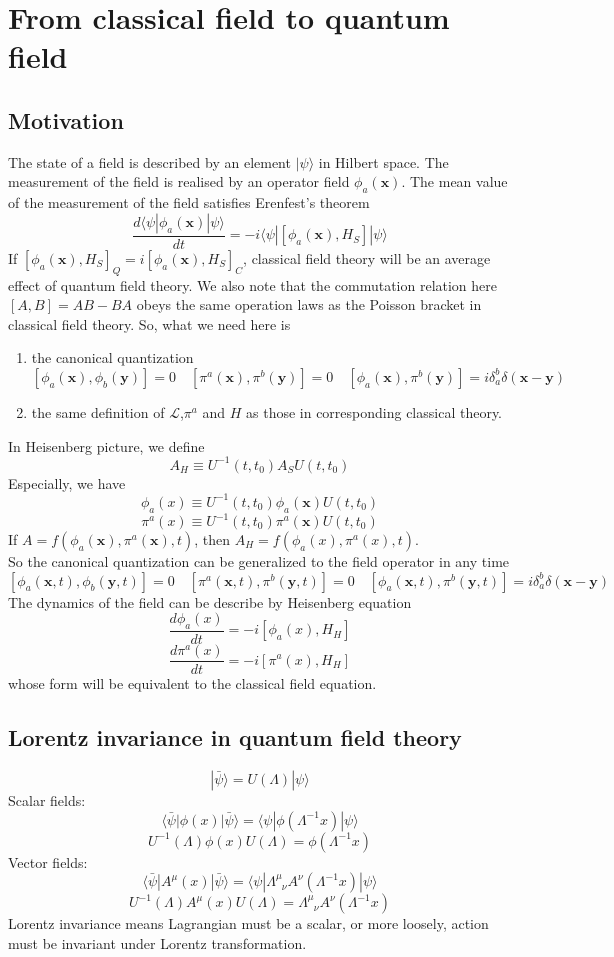 \chapter{From classical field to quantum field}
\section{Motivation}
\noindent
The state of a field is described by an element $|\psi\rangle$ in Hilbert space. The measurement of the field is realised by an operator field $\phi_a(\bm{x})$. The mean value of the measurement of the field satisfies Erenfest's theorem
\[\frac{d\langle \psi| \phi_a(\bm{x}) | \psi \rangle}{dt} = -i \langle \psi | [\phi_a(\bm{x}),H_S] | \psi \rangle\]
If $[\phi_a(\bm{x}),H_S]_Q = i[\phi_a(\bm{x}),H_S]_C$, classical field theory will be an average effect of quantum field theory. We also note that the commutation relation here $[A,B] = AB - BA$ obeys the same operation laws as the Poisson bracket in classical field theory. So, what we need here is
\begin{enumerate}
\item the canonical quantization
\[[\phi_a(\bm{x}),\phi_b(\bm{y})] = 0 \quad [\pi^a(\bm{x}),\pi^b(\bm{y})] = 0 \quad [\phi_a(\bm{x}),\pi^b(\bm{y})] = i \delta_a^b \delta(\bm{x}-\bm{y}) \]
\item the same definition of $\mathcal{L}$,$\pi^a$ and $H$ as those in corresponding classical theory.
\end{enumerate}
In Heisenberg picture, we define
\[A_H \equiv U^{-1}(t,t_0) A_S U(t,t_0)\]
Especially, we have
\[\phi_a(x) \equiv U^{-1}(t,t_0) \phi_a(\bm{x}) U(t,t_0)\]
\[\pi^a(x) \equiv U^{-1}(t,t_0) \pi^a(\bm{x}) U(t,t_0)\]
If $A = f(\phi_a(\bm{x}),\pi^a(\bm{x}),t)$, then $A_H = f(\phi_a(x),\pi^a(x),t)$. 
\\
So the canonical quantization can be generalized to the field operator in any time
\[[\phi_a(\bm{x},t),\phi_b(\bm{y},t)] = 0 \quad [\pi^a(\bm{x},t),\pi^b(\bm{y},t)] = 0 \quad [\phi_a(\bm{x},t),\pi^b(\bm{y},t)] = i \delta_a^b \delta(\bm{x}-\bm{y}) \]
The dynamics of the field can be describe by Heisenberg equation
\[\frac{d\phi_a(x)}{dt} = -i[\phi_a(x),H_H]\]
\[\frac{d\pi^a(x)}{dt} = -i[\pi^a(x),H_H]\]
whose form will be equivalent to the classical field equation.

\section{Lorentz invariance in quantum field theory}
\[| \bar{\psi}\rangle = U(\Lambda)| \psi\rangle\]
Scalar fields:
\[\langle \bar{\psi} | \phi(x) | \bar{\psi}\rangle = \langle \psi | \phi(\Lambda^{-1}x) | \psi\rangle\]
\[U^{-1}(\Lambda) \phi(x) U(\Lambda) = \phi(\Lambda^{-1}x)\]
Vector fields:
\[\langle \bar{\psi} | A^{\mu}(x) | \bar{\psi}\rangle = \langle \psi | \Lambda^{\mu}_{\phantom{\mu}\nu} A^{\nu}(\Lambda^{-1}x) | \psi\rangle\]
\[U^{-1}(\Lambda) A^{\mu}(x) U(\Lambda) = \Lambda^{\mu}_{\phantom{\mu}\nu} A^{\nu}(\Lambda^{-1}x)\]
Lorentz invariance means Lagrangian must be a scalar, or more loosely, action must be invariant under Lorentz transformation.

